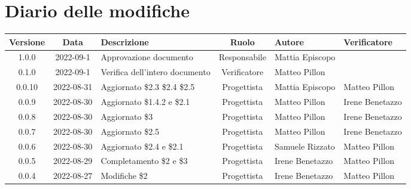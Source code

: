\section*{Diario delle modifiche}
	\begin{center}
	\renewcommand{\arraystretch}{1.8} %
	\begin{longtable}{ |c|c|p{8em}|c|m{5em}|m{6em}| }
	\hline
	\textbf{Versione} & \textbf{Data} & \textbf{Descrizione} &  \textbf{Ruolo} &  \textbf{Autore} & \textbf{Verificatore}\\ %
	\hline %
	1.0.0 & 2022-09-1 & Approvazione documento & Responsabile & Mattia \newline Episcopo & \\ 
	\hline
	0.1.0 & 2022-09-1 & Verifica dell'intero documento & Verificatore & Matteo \newline Pillon & \\ 
	\hline
	0.0.10 & 2022-08-31 & Aggiornato \$2.3 \$2.4 \$2.5 & Progettista & Mattia \newline Episcopo & Matteo \newline Pillon\\ 
	\hline
	0.0.9 & 2022-08-30 & Aggiornato \$1.4.2 e \$2.1 & Progettista & Matteo \newline Pillon & Irene \newline Benetazzo\\ 
	\hline
	0.0.8 & 2022-08-30 & Aggiornato \$3 & Progettista & Matteo \newline Pillon & Irene \newline Benetazzo\\ 
	\hline
	0.0.7 & 2022-08-30 & Aggiornato \$2.5 & Progettista & Matteo \newline Pillon & Irene \newline Benetazzo\\ 
	\hline
	0.0.6 & 2022-08-30 & Aggiornato \$2.4 e \$2.1 & Progettista & Samuele \newline Rizzato & Matteo Pillon \\ 
	\hline
	0.0.5 & 2022-08-29 & Completamento \$2 e \$3 & Progettista & Irene \newline Benetazzo & Matteo \newline Pillon\\ 
	\hline
	0.0.4 & 2022-08-27 & Modifiche \$2 & Progettista & Irene \newline Benetazzo & Matteo \newline Pillon \\ 

\end{longtable}
\end{center}
